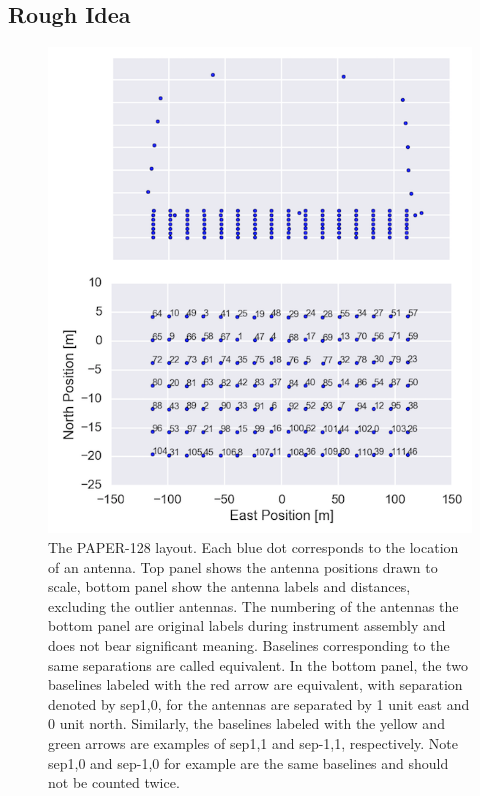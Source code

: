 \documentclass[preprint2,numberedappendix,tighten,twocolappendix]{aastex6}  %
\renewcommand\[{\begin{equation}}
\renewcommand\]{\end{equation}}
\begin{document}
\subsection{Rough Idea}
\begin{figure}[H]
\includegraphics[width=\linewidth]{antpos128}

\caption{The PAPER-128 layout. Each blue dot corresponds to the location of
an antenna. Top panel shows the antenna positions drawn to scale,
bottom panel show the antenna labels and distances, excluding the outlier
antennas.\label{fig:AntPos}
The numbering of the antennas the bottom panel are original labels
during instrument assembly and does not bear significant
meaning. Baselines corresponding to the same separations are called
equivalent. In the bottom panel, the two baselines labeled with the
red arrow are equivalent, with separation denoted by sep1,0, for the
antennas are separated by 1 unit east and 0 unit north. Similarly,
the baselines labeled with the yellow and green arrows are examples
of sep1,1 and sep-1,1, respectively. Note sep1,0 and sep-1,0 for example
are the same baselines and should not be counted twice.}
\end{figure}
\end{document}

